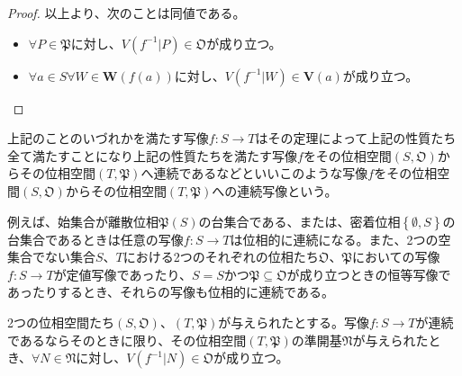\documentclass[dvipdfmx]{jsarticle}
\begin{document}
\begin{proof}
以上より、次のことは同値である。
\begin{itemize}
\item
  $\forall P \in \mathfrak{P}$に対し、$V\left( f^{- 1}|P \right)\in \mathfrak{O}$が成り立つ。
\item
  $\forall a \in S\forall W \in \mathbf{W}\left( f(a) \right)$に対し、$V\left( f^{- 1}|W \right) \in \mathbf{V}(a)$が成り立つ。
\end{itemize}
\end{proof}
\begin{dfn}
上記のことのいづれかを満たす写像$f:S \rightarrow T$はその定理によって上記の性質たち全て満たすことになり上記の性質たちを満たす写像$f$をその位相空間$\left( S,\mathfrak{O} \right)$からその位相空間$\left( T,\mathfrak{P} \right)$へ連続であるなどといいこのような写像$f$をその位相空間$\left( S,\mathfrak{O} \right)$からその位相空間$\left( T,\mathfrak{P} \right)$への連続写像という。
\end{dfn}\par
例えば、始集合が離散位相$\mathfrak{P}(S)$の台集合である、または、密着位相$\left\{ \emptyset,S \right\}$の台集合であるときは任意の写像$f:S \rightarrow T$は位相的に連続になる。また、2つの空集合でない集合$S$、$T$における2つのそれぞれの位相たち$\mathfrak{O}$、$\mathfrak{P}$においての写像$f:S \rightarrow T$が定値写像であったり、$S = S$かつ$\mathfrak{P} \subseteq \mathfrak{O}$が成り立つときの恒等写像であったりするとき、それらの写像も位相的に連続である。
\begin{thm}\label{8.1.3.2}
2つの位相空間たち$\left( S,\mathfrak{O} \right)$、$\left( T,\mathfrak{P} \right)$が与えられたとする。写像$f:S \rightarrow T$が連続であるならそのときに限り、その位相空間$\left( T,\mathfrak{P} \right)$の準開基$\mathfrak{N}$が与えられたとき、$\forall N \in \mathfrak{N}$に対し、$V\left( f^{- 1}|N \right) \in \mathfrak{O}$が成り立つ。
\end{thm}
\end{document}
